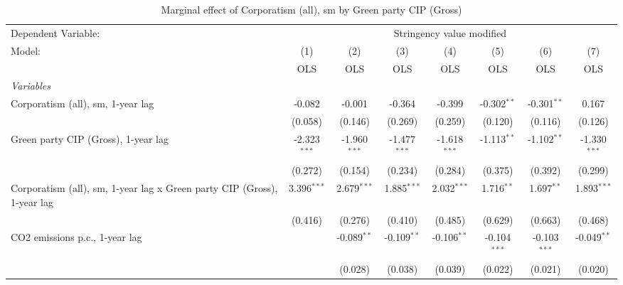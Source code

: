 
\begin{table}[htbp]
   \caption{Marginal effect of Corporatism (all), sm by Green party CIP (Gross)}
   \centering
   \begin{tabular}{lccccccc}
      \toprule
      Dependent Variable: & \multicolumn{7}{c}{Stringency value modified}\\
      Model:                                                                  & (1)            & (2)            & (3)            & (4)            & (5)            & (6)            & (7)\\  
                                                                              &  OLS           & OLS            & OLS            & OLS            & OLS            & OLS            & OLS\\  
      \midrule
      \emph{Variables}\\
      Corporatism (all), sm, 1-year lag                                       & -0.082         & -0.001         & -0.364         & -0.399         & -0.302$^{**}$  & -0.301$^{**}$  & 0.167\\   
                                                                              & (0.058)        & (0.146)        & (0.269)        & (0.259)        & (0.120)        & (0.116)        & (0.126)\\   
      Green party CIP (Gross), 1-year lag                                     & -2.323$^{***}$ & -1.960$^{***}$ & -1.477$^{***}$ & -1.618$^{***}$ & -1.113$^{**}$  & -1.102$^{**}$  & -1.330$^{***}$\\   
                                                                              & (0.272)        & (0.154)        & (0.234)        & (0.284)        & (0.375)        & (0.392)        & (0.299)\\   
      Corporatism (all), sm, 1-year lag x Green party CIP (Gross), 1-year lag & 3.396$^{***}$  & 2.679$^{***}$  & 1.885$^{***}$  & 2.032$^{***}$  & 1.716$^{**}$   & 1.697$^{**}$   & 1.893$^{***}$\\   
                                                                              & (0.416)        & (0.276)        & (0.410)        & (0.485)        & (0.629)        & (0.663)        & (0.468)\\   
      CO2 emissions p.c., 1-year lag                                          &                & -0.089$^{**}$  & -0.109$^{**}$  & -0.106$^{**}$  & -0.104$^{***}$ & -0.103$^{***}$ & -0.049$^{**}$\\   
                                                                              &                & (0.028)        & (0.038)        & (0.039)        & (0.022)        & (0.021)        & (0.020)\\   

\end{tabular}
\end{table}
